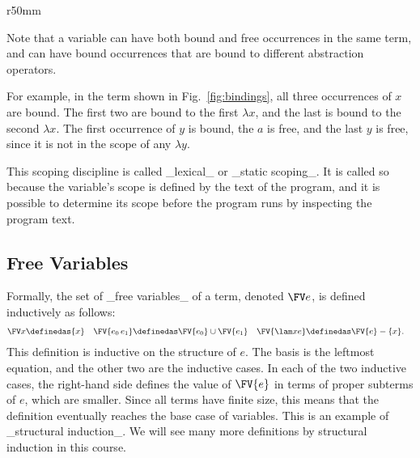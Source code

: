 \begin{wrapfigure}[6]{r}{50mm}
 \caption{Scope and bindings}
 \label{fig:bindings}
\end{wrapfigure}
Note that a variable can have both bound and free occurrences in the same term, and can have bound occurrences that are bound to different abstraction operators.

For example, in the term shown in Fig.~\ref{fig:bindings},
all three occurrences of $x$ are bound. The first two are bound to the first $\lambda x$, and the last is bound to the second $\lambda x$. The first occurrence of $y$ is bound, the $a$ is free, and the last $y$ is free, since it is
not in the scope of any $\lambda y$.

This scoping discipline is called _lexical_ or _static scoping_. It is called so
because the variable's scope is defined by the text of the program, and it is
possible to determine its scope before the program runs by inspecting the
program text.

\subsection{Free Variables}

Formally, the set of _free variables_ of a term, denoted $\FV e$, is defined inductively as follows:
\begin{align*}
\FV x &\definedas \{x\} & \FV{e_0\,e_1} &\definedas \FV{e_0} \cup \FV{e_1} & \FV{\lam xe} &\definedas \FV{e} - \{x\}.
\end{align*}
This definition is inductive on the structure of $e$. The basis is the leftmost
equation, and the other two are the inductive cases. In each of the two inductive cases,
the right-hand side defines the value of $\FV{e}$ in terms of
proper subterms of $e$, which are smaller.
Since all terms have finite size, this means that the
definition eventually reaches the base case of variables. This is an example
of _structural induction_. We will see many more definitions by structural induction in this course.

